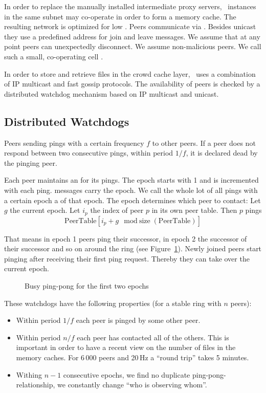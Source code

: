 In order to replace the manually installed intermediate proxy servers, \cvmfs\ instances in the same subnet may co-operate in order to form a memory cache.
The resulting network is optimized for low .
Peers communicate via .
Besides unicast they use a predefined  address for join and leave messages.
We assume that at any point peers can unexpectedly disconnect.
We assume non-malicious peers.
We call such a small, co-operating cell .

In order to store and retrieve files in the crowd cache layer, \cvmfs\ uses a combination of IP multicast and fast gossip protocols.
The availability of peers is checked by a distributed watchdog mechanism based on IP multicast and unicast.

\subsection{Distributed Watchdogs}
\label{sct:watchdogs}

Peers sending pings with a certain frequency $f$ to other peers.
If a peer does not respond between two consecutive pings, \ie within period $1/f$, it is declared dead by the pinging peer.

Each peer maintains an  for its pings.
The epoch starts with 1 and is incremented with each ping.
 messages carry the epoch.
We call the whole lot of all pings with a certain epoch a  of that epoch.
The epoch determines which peer to contact:
Let $g$ the current epoch. 
Let $i_p$ the index of peer $p$ in its own peer table.
Then $p$ pings 
	\[ \text{PeerTable}[i_p + g \mod \text{size}(\text{PeerTable})] \]

That means in epoch 1 peers ping their successor, in epoch 2 the successor of their successor and so on around the ring (see Figure~\ref{fig:busypingpong}).
Newly joined peers start pinging after receiving their first ping request.
Thereby they can take over the current epoch.
\begin{figure}
	\centering \resizebox{0.5\linewidth}{!}{}
	\caption{Busy ping-pong for the first two epochs}
	\label{fig:busypingpong}
\end{figure}

These watchdogs have the following properties (for a stable ring with $n$ peers):
\begin{itemize}
	\item Within period $1/f$ each peer is pinged by some other peer.
	\item Within period $n/f$ each peer has contacted all of the others.  
		This is important in order to have a recent view on the number of files in the memory caches. 
		For 6\,000 peers and 20\,Hz a ``round trip'' takes 5 minutes.
	\item Withing $n-1$ consecutive epochs, we find no duplicate ping-pong-relationship, \ie we constantly change ``who is observing whom''.
\end{itemize}

